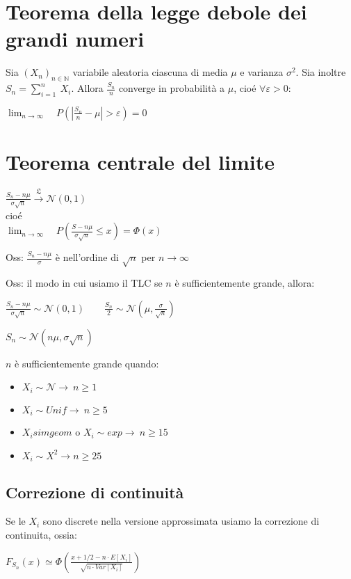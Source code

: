 \documentclass[11pt, letterpaper]{article}
\begin{document}
\section{Teorema della legge debole dei grandi numeri}
Sia $(X_{n})_{n\in\mathbb{N}}$ variabile aleatoria ciascuna di media $\mu$ e  varianza $\sigma^{2}$. Sia inoltre
$S_{n}=\sum_{i=1}^{n}\ X_{i}$. Allora $\frac{S_{n}}{n}$ converge in probabilità a $\mu$, cioé $\forall\varepsilon
>0$:
\begin{center}
    $\lim_{n\to\infty}\quad P(|\frac{S_{n}}{n}-\mu|>\varepsilon)=0$
\end{center}

\section{Teorema centrale del limite}
\begin{center}
    $\frac{S_{n}-n\mu}{\sigma\sqrt{n}}\xrightarrow{\mathfrak{L}}\mathcal{N}(0,1)$\\
    cioé\\
    $\lim_{n\to\infty}\quad P(\frac{S-n\mu}{\sigma\sqrt{n}}\leq x)=\Phi(x)$
\end{center}

Oss: $\frac{S_{n}-n\mu}{\sigma}$ è nell'ordine di $\sqrt{n}$ per $n\to\infty$

Oss: il modo in cui usiamo il TLC se $n$ è sufficientemente grande, allora:
\begin{center}
    $\frac{S_{n}-n\mu}{\sigma\sqrt{n}}\sim\mathcal{N}(0,1)\qquad\frac{S_{n}}{2}\sim\mathcal{N}(\mu,
    \frac{\sigma}{\sqrt{n}})$

    $S_{n}\sim\mathcal{N}(n\mu,\sigma\sqrt{n})$
\end{center}
$n$ è sufficientemente grande quando:
\begin{itemize}
    \item $X_{i}\sim\mathcal{N}\to\ n\geq 1$
    \item $X_{i}\sim Unif\to\ n\geq 5$
    \item $X_{i}sim geom$ o $X_{i}\sim exp\to\ n\geq 15$
    \item $X_{i}\sim X^{2}\to n\geq 25$
\end{itemize}

\subsection{Correzione di continuità}
Se le $X_{i}$ sono discrete nella versione approssimata usiamo la correzione di continuita, ossia:
\begin{center}
    $F_{S_{n}}(x)\simeq\Phi\left(\frac{x+1/2-n\cdot E[X_{i}]}{\sqrt{n\cdot Var[X_{i}]}}\right)$
\end{center}
\end{document}
